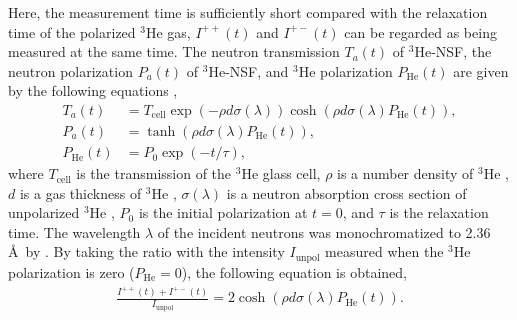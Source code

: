 \documentclass[%
 reprint,
superscriptaddress,
 amsmath,amssymb,
 aps,
]{revtex4-2}
\newcommand{\He}{$^3$He }
\newcommand{\Hensf}{$^3$He-NSF}
\providecommand{\DIFaddtex}[1]{{\protect\color{blue}\uwave{#1}}} %
\providecommand{\DIFaddbegin}{} %
\providecommand{\DIFaddend}{} %
\providecommand{\DIFadd}[1]{\texorpdfstring{\DIFaddtex{#1}}{#1}} %
\newcommand{\DIFaddincludegraphics}[2][]{{\color{blue}\fbox{\DIFOincludegraphics[#1]{#2}}}} %
\DeclareRobustCommand{\DIFaddbegin}{\DIFOaddbegin \let\includegraphics\DIFaddincludegraphics} %
\DeclareRobustCommand{\DIFaddend}{\DIFOaddend \let\includegraphics\DIFOincludegraphics} %
\begin{document}
Here, the measurement time is sufficiently short compared with the relaxation time of the polarized \He gas, $I^{++}(t)$ and $I^{+-}(t)$ can be regarded as being measured at the same time.
The neutron transmission $T_a(t)$ of \Hensf, the neutron polarization $P_a(t)$ of \Hensf, and \He polarization $P_\mathrm{He}(t)$ are given by the following equations \DIFaddbegin \DIFadd{\mbox{%
\cite{coulter_neutron_1990}}\hskip0pt%
}\DIFaddend ,
\begin{align}
    T_a(t) &= T_\mathrm{cell}\exp(-\rho d \sigma(\lambda))\cosh(\rho d \sigma(\lambda)P_\mathrm{He}(t)),\\
    P_a(t) &= \tanh(\rho d \sigma(\lambda)P_\mathrm{He}(t)),\\
    P_\mathrm{He}(t) &= P_0 \exp(-t/\tau),
    \label{eq:transmission_3He}
\end{align}
where $T_\mathrm{cell}$ is the transmission of the \He glass cell, $\rho$ is a number density of \He, $d$ is a gas thickness of \He,
$\sigma (\lambda)$ is a neutron absorption cross section of unpolarized \He,
$P_0$ is the initial polarization at $t=0$, and $\tau$ is the relaxation time.
The wavelength $\lambda$ of the incident neutrons was monochromatized to 2.36 \AA~by .
By taking the ratio with the intensity $I_\mathrm{unpol}$ measured when the \He polarization is zero ($P_\mathrm{He} = 0$), the following equation is obtained,
\begin{align}
    \frac{I^{++}(t)+I^{+-}(t)}{I_\mathrm{unpol}} = 2\cosh(\rho d \sigma(\lambda)P_\mathrm{He}(t)).
    \label{eq:transmission_ratio}
\end{align}
\end{document}
